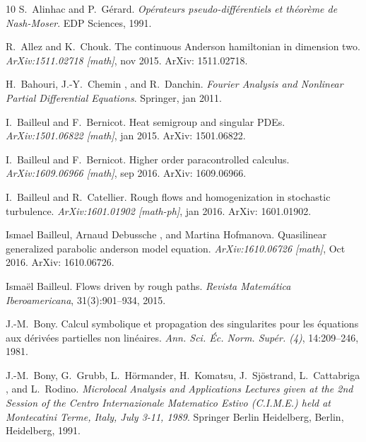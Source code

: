 \documentclass[11pt,reqno]{amsart}
\newcommand{\tmtextit}[1]{{\itshape{#1}}}
\begin{document}
\begin{thebibliography}{10}
  S.~Alinhac  and 
  P.~G{\'e}rard.{\newblock} \tmtextit{Op{\'e}rateurs pseudo-diff{\'e}rentiels
  et th{\'e}or{\`e}me de Nash-Moser}.{\newblock} EDP Sciences,
  1991.{\newblock}
  
  R.~Allez  and  K.~Chouk.{\newblock} The
  continuous Anderson hamiltonian in dimension two.{\newblock}
  \tmtextit{ArXiv:1511.02718 [math]}, nov 2015.{\newblock} ArXiv:
  1511.02718.{\newblock}
  
  H.~Bahouri, J.-Y.~Chemin , and 
  R.~Danchin.{\newblock} \tmtextit{Fourier Analysis and Nonlinear Partial
  Differential Equations}.{\newblock} Springer, jan 2011.{\newblock}
  
  I.~Bailleul  and  F.~Bernicot.{\newblock}
  Heat semigroup and singular PDEs.{\newblock} \tmtextit{ArXiv:1501.06822
  [math]}, jan 2015.{\newblock} ArXiv: 1501.06822.{\newblock}
  
  I.~Bailleul  and  F.~Bernicot.{\newblock}
  Higher order paracontrolled calculus.{\newblock} \tmtextit{ArXiv:1609.06966
  [math]}, sep 2016.{\newblock} ArXiv: 1609.06966.{\newblock}
  
  I.~Bailleul  and  R.~Catellier.{\newblock}
  Rough flows and homogenization in stochastic turbulence.{\newblock}
  \tmtextit{ArXiv:1601.01902 [math-ph]}, jan 2016.{\newblock} ArXiv:
  1601.01902.{\newblock}
  
  Ismael Bailleul, Arnaud Debussche , and  Martina
  Hofmanova.{\newblock} Quasilinear generalized parabolic anderson model
  equation.{\newblock} \tmtextit{ArXiv:1610.06726 [math]}, Oct
  2016.{\newblock} ArXiv: 1610.06726.{\newblock}
  
  Isma{\"e}l Bailleul.{\newblock} Flows driven
  by rough paths.{\newblock} \tmtextit{Revista Matem{\'a}tica Iberoamericana},
  31(3):901--934, 2015.{\newblock}
  
  J.-M.~Bony.{\newblock} Calcul symbolique et propagation
  des singularites pour les {\'e}quations aux d{\'e}riv{\'e}es partielles non
  lin{\'e}aires.{\newblock} \tmtextit{Ann. Sci. {\'E}c. Norm. Sup{\'e}r. (4)},
  14:209--246, 1981.{\newblock}
  
  J.-M.~Bony, G.~Grubb, L.~H{\"o}rmander,
  H.~Komatsu, J.~Sj{\"o}strand, L.~Cattabriga , and  L.~Rodino.{\newblock}
  \tmtextit{Microlocal Analysis and Applications Lectures given at the 2nd
  Session of the Centro Internazionale Matematico Estivo (C.I.M.E.) held at
  Montecatini Terme, Italy, July 3-11, 1989}.{\newblock} Springer Berlin
  Heidelberg, Berlin, Heidelberg, 1991.{\newblock}
  

\end{thebibliography}
\end{document}
